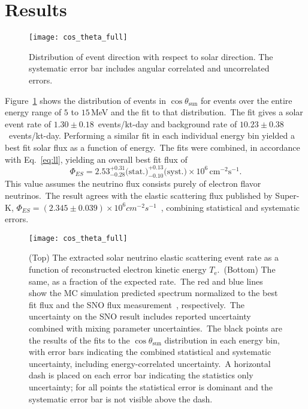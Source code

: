 \section{Results}
\begin{figure}
  \centering
  \texttt{[image: cos\_theta\_full]}
  \caption[5.0 to 15.0 MeV $\cos\theta_{sun}$ Distribution] {Distribution of event direction
                                              with respect to solar direction.
                                              The systematic error bar includes
                                              angular correlated and
                                              uncorrelated errors.}

  \label{fig:costheta}
\end{figure}
Figure~\ref{fig:costheta} shows the distribution of events in $\cos\theta_\text{{sun}}$
for events over the entire energy range of $5$ to $15$\,MeV and the fit to that distribution.\
The fit gives a solar event rate of $1.30\pm0.18$~events/kt-day
 and background rate of  $10.23\pm0.38$~events/kt-day.
Performing a similar fit in each individual energy bin yielded a best fit solar flux
as a function of energy.\
The fits were combined, in accordance with Eq.~\ref{eq:ll}, yielding an overall best fit flux of
\begin{equation*}
    \Phi_{ES}= 2.53^{+0.31}_{-0.28}\text{(stat.)}^{+0.13}_{-0.10}\text{(syst.)}\times10^6\,\text{cm}^{-2}\text{s}^{-1}\text{.}
\end{equation*}
This value assumes the neutrino flux consists purely of electron flavor neutrinos.\
The result agrees with the elastic scattering flux published by Super-K,
$\Phi_{ES}=\left(2.345\pm0.039\right)\times10^{6}cm^{-2}s^{-1}$~\citep{superk4},
combining statistical and systematic errors.\

\begin{figure}
  \centering
  \texttt{[image: cos\_theta\_full]}
  \caption[Solar Spectrum Data to MC Comparison]{
    (Top) The extracted solar neutrino elastic scattering event rate as a
    function of reconstructed electron kinetic energy $T_{\mathrm{e}}$.\
    (Bottom) The same, as a fraction of the expected rate.\
    The red and blue lines show the MC simulation predicted spectrum normalized
    to the best fit flux and the SNO flux measurement~\citep{sno_combined}, respectively.\
    The uncertainty on the SNO result includes reported uncertainty combined with
    mixing parameter uncertainties.\
    The black points are the results of the fits to the $\cos\theta_\text{{sun}}$
    distribution in each energy bin,
    with error bars indicating the combined statistical and systematic
    uncertainty, including energy-correlated uncertainty.\
    A horizontal dash is placed on each error bar indicating the statistics
    only uncertainty; for all points the statistical error is dominant and the systematic
    error bar is not visible above the dash.}
  \label{fig:spectrum}
\end{figure}

